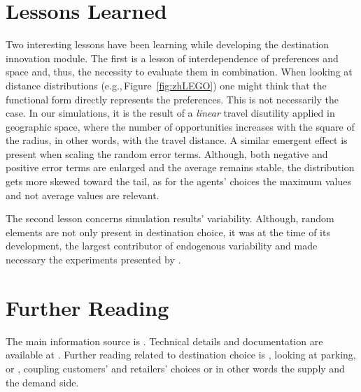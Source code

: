 \section{Lessons Learned}
Two interesting lessons have been learning while developing the destination innovation module. The first is a lesson of interdependence of preferences and space and,  thus, the necessity to evaluate them in combination. When looking at distance distributions (e.g.,\,Figure~\ref{fig:zhLEGO}) one might think that the functional form directly represents the preferences. This is not necessarily the case. In our simulations, it is the result of a \emph{linear} travel disutility applied in geographic space, where the number of opportunities increases with the square of the radius, in other words, with the travel distance. A similar emergent effect is present when scaling the random error terms. Although, both negative and positive error terms are enlarged and the average remains stable, the distribution gets more skewed toward the tail, as for the agents' choices the maximum values and not average values are relevant.

The second lesson concerns simulation results' variability. Although, random elements are not only present in destination choice, it was at the time of its development, the largest contributor of endogenous variability and made necessary the experiments presented by \citet[][]{HorniEtAl_TechRep_IVT_2011_b}.

\section{Further Reading}
The main information source is \citet[][]{Horni_PhDThesis_2013}. Technical details and documentation are available at \citet[][]{MATSIM-T-DC_Webpage_2014}. Further reading related to destination choice is \citet[][]{HorniEtAl_IATBRspec_2013}, looking at parking, or \citet[][]{HorniEtAl_TechRep_IVT_2012}, coupling customers' and retailers' choices or in other words the supply and the demand side.




